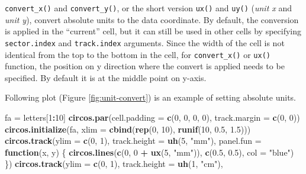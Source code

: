 \documentclass[]{book}
\newenvironment{Shaded}{\begin{snugshade}}{\end{snugshade}}
\newcommand{\KeywordTok}[1]{\textcolor[rgb]{0.13,0.29,0.53}{\textbf{#1}}}
\newcommand{\DataTypeTok}[1]{\textcolor[rgb]{0.13,0.29,0.53}{#1}}
\newcommand{\DecValTok}[1]{\textcolor[rgb]{0.00,0.00,0.81}{#1}}
\newcommand{\FloatTok}[1]{\textcolor[rgb]{0.00,0.00,0.81}{#1}}
\newcommand{\StringTok}[1]{\textcolor[rgb]{0.31,0.60,0.02}{#1}}
\newcommand{\ControlFlowTok}[1]{\textcolor[rgb]{0.13,0.29,0.53}{\textbf{#1}}}
\newcommand{\OperatorTok}[1]{\textcolor[rgb]{0.81,0.36,0.00}{\textbf{#1}}}
\newcommand{\NormalTok}[1]{#1}
\theoremstyle{definition}
\theoremstyle{definition}
\theoremstyle{remark}
\begin{document}
\texttt{convert\_x()} and \texttt{convert\_y()}, or the short version
\texttt{ux()} and \texttt{uy()} (\emph{unit x} and \emph{unit y}),
convert absolute units to the data coordinate. By default, the
conversion is applied in the ``current'' cell, but it can still be used
in other cells by specifying \texttt{sector.index} and
\texttt{track.index} arguments. Since the width of the cell is not
identical from the top to the bottom in the cell, for
\texttt{convert\_x()} or \texttt{ux()} function, the position on y
direction where the convert is applied needs to be specified. By default
it is at the middle point on y-axis.

Following plot (Figure \ref{fig:unit-convert}) is an example of setting
absolute units.

\begin{Shaded}
\begin{Highlighting}[]
\NormalTok{fa =}\StringTok{ }\NormalTok{letters[}\DecValTok{1}\OperatorTok{:}\DecValTok{10}\NormalTok{]}
\KeywordTok{circos.par}\NormalTok{(}\DataTypeTok{cell.padding =} \KeywordTok{c}\NormalTok{(}\DecValTok{0}\NormalTok{, }\DecValTok{0}\NormalTok{, }\DecValTok{0}\NormalTok{, }\DecValTok{0}\NormalTok{), }\DataTypeTok{track.margin =} \KeywordTok{c}\NormalTok{(}\DecValTok{0}\NormalTok{, }\DecValTok{0}\NormalTok{))}
\KeywordTok{circos.initialize}\NormalTok{(fa, }\DataTypeTok{xlim =} \KeywordTok{cbind}\NormalTok{(}\KeywordTok{rep}\NormalTok{(}\DecValTok{0}\NormalTok{, }\DecValTok{10}\NormalTok{), }\KeywordTok{runif}\NormalTok{(}\DecValTok{10}\NormalTok{, }\FloatTok{0.5}\NormalTok{, }\FloatTok{1.5}\NormalTok{)))}
\KeywordTok{circos.track}\NormalTok{(}\DataTypeTok{ylim =} \KeywordTok{c}\NormalTok{(}\DecValTok{0}\NormalTok{, }\DecValTok{1}\NormalTok{), }\DataTypeTok{track.height =} \KeywordTok{uh}\NormalTok{(}\DecValTok{5}\NormalTok{, }\StringTok{"mm"}\NormalTok{),}
    \DataTypeTok{panel.fun =} \ControlFlowTok{function}\NormalTok{(x, y) \{}
        \KeywordTok{circos.lines}\NormalTok{(}\KeywordTok{c}\NormalTok{(}\DecValTok{0}\NormalTok{, }\DecValTok{0} \OperatorTok{+}\StringTok{ }\KeywordTok{ux}\NormalTok{(}\DecValTok{5}\NormalTok{, }\StringTok{"mm"}\NormalTok{)), }\KeywordTok{c}\NormalTok{(}\FloatTok{0.5}\NormalTok{, }\FloatTok{0.5}\NormalTok{), }\DataTypeTok{col =} \StringTok{"blue"}\NormalTok{)}
\NormalTok{    \})}
\KeywordTok{circos.track}\NormalTok{(}\DataTypeTok{ylim =} \KeywordTok{c}\NormalTok{(}\DecValTok{0}\NormalTok{, }\DecValTok{1}\NormalTok{), }\DataTypeTok{track.height =} \KeywordTok{uh}\NormalTok{(}\DecValTok{1}\NormalTok{, }\StringTok{"cm"}\NormalTok{),}

\end{Highlighting}
\end{Shaded}
\end{document}
